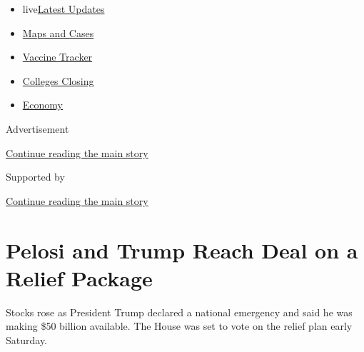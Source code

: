 \begin{itemize}
\tightlist
\item
  live\href{https://www.nytimes3xbfgragh.onion/2020/08/21/world/covid-19-coronavirus.html?name=styln-coronavirus-national\&region=TOP_BANNER\&variant=undefined\&block=storyline_menu_recirc\&action=click\&pgtype=Article\&impression_id=9fcf9941-e39b-11ea-ad54-c52f02c320cd}{Latest
  Updates}
\item
  \href{https://www.nytimes3xbfgragh.onion/interactive/2020/us/coronavirus-us-cases.html?name=styln-coronavirus-national\&region=TOP_BANNER\&variant=undefined\&block=storyline_menu_recirc\&action=click\&pgtype=Article\&impression_id=9fcf9942-e39b-11ea-ad54-c52f02c320cd}{Maps
  and Cases}
\item
  \href{https://www.nytimes3xbfgragh.onion/interactive/2020/science/coronavirus-vaccine-tracker.html?name=styln-coronavirus-national\&region=TOP_BANNER\&variant=undefined\&block=storyline_menu_recirc\&action=click\&pgtype=Article\&impression_id=9fcf9943-e39b-11ea-ad54-c52f02c320cd}{Vaccine
  Tracker}
\item
  \href{https://www.nytimes3xbfgragh.onion/2020/08/19/us/colleges-closing-covid.html?name=styln-coronavirus-national\&region=TOP_BANNER\&variant=undefined\&block=storyline_menu_recirc\&action=click\&pgtype=Article\&impression_id=9fcfc050-e39b-11ea-ad54-c52f02c320cd}{Colleges
  Closing}
\item
  \href{https://www.nytimes3xbfgragh.onion/live/2020/08/20/business/stock-market-today-coronavirus?name=styln-coronavirus-national\&region=TOP_BANNER\&variant=undefined\&block=storyline_menu_recirc\&action=click\&pgtype=Article\&impression_id=9fcfc051-e39b-11ea-ad54-c52f02c320cd}{Economy}
\end{itemize}

Advertisement

\protect\hyperlink{after-top}{Continue reading the main story}

Supported by

\protect\hyperlink{after-sponsor}{Continue reading the main story}

\hypertarget{pelosi-and-trump-reach-deal-on-a-relief-package}{%
\section{Pelosi and Trump Reach Deal on a Relief
Package}\label{pelosi-and-trump-reach-deal-on-a-relief-package}}

Stocks rose as President Trump declared a national emergency and said he
was making \$50 billion available. The House was set to vote on the
relief plan early Saturday.

